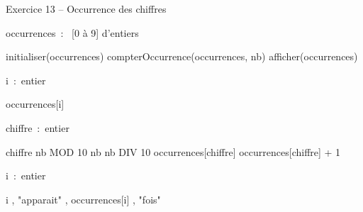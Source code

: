 \begin{Emphase}{Exercice 13 -- Occurrence des chiffres}

\begin{pseudoN}


    \Decl occurrences~:~ [0 à 9] d’entiers

    \Let initialiser(occurrences)
    \Let compterOccurrence(occurrences, nb)
    \Let afficher(occurrences)

\EndModule

    \Empty


    \Decl i~:~entier


        \Let occurrences[i] 

    \EndFor

\EndModule



    \Decl chiffre~:~entier


        \Let chiffre \Gets nb MOD 10
        \Let nb \Gets nb DIV 10
        \Let occurrences[chiffre] \Gets occurrences[chiffre] + 1

    \EndWhile

\EndModule



    \Decl i~:~entier

        

            \Write i , "apparait" , occurrences[i] , "fois"

        \EndIf

    \EndFor

\EndModule

\end{pseudoN}

\end{Emphase}


